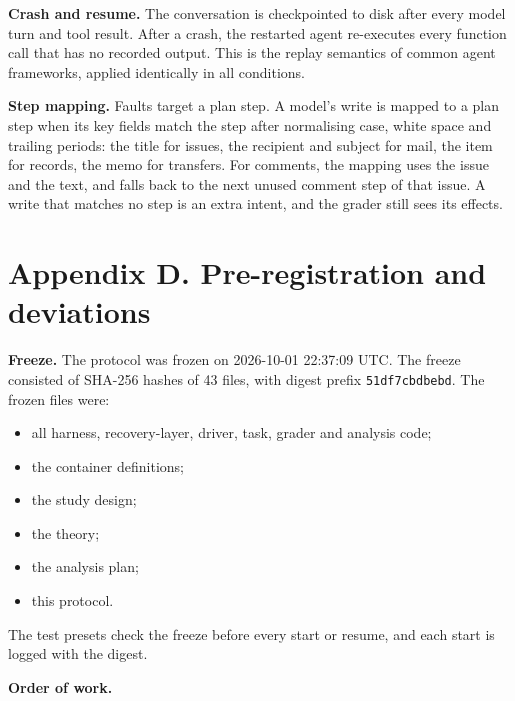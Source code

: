 \documentclass[
  10pt,
]{article}
\providecommand{\tightlist}{%
  \setlength{\itemsep}{0pt}\setlength{\parskip}{0pt}}
\begin{document}
\textbf{Crash and resume.} The conversation is checkpointed to disk
after every model turn and tool result. After a crash, the restarted
agent re-executes every function call that has no recorded output. This
is the replay semantics of common agent frameworks, applied identically
in all conditions.

\textbf{Step mapping.} Faults target a plan step. A model's write is
mapped to a plan step when its key fields match the step after
normalising case, white space and trailing periods: the title for
issues, the recipient and subject for mail, the item for records, the
memo for transfers. For comments, the mapping uses the issue and the
text, and falls back to the next unused comment step of that issue. A
write that matches no step is an extra intent, and the grader still sees
its effects.

\hypertarget{appendix-d.-pre-registration-and-deviations}{%
\section*{Appendix D. Pre-registration and
deviations}\label{appendix-d.-pre-registration-and-deviations}}

\textbf{Freeze.} The protocol was frozen on 2026-10-01 22:37:09 UTC. The
freeze consisted of SHA-256 hashes of 43 files, with digest prefix
\texttt{51df7cbdbebd}. The frozen files were:

\begin{itemize}
\tightlist
\item
  all harness, recovery-layer, driver, task, grader and analysis code;
\item
  the container definitions;
\item
  the study design;
\item
  the theory;
\item
  the analysis plan;
\item
  this protocol.
\end{itemize}

The test presets check the freeze before every start or resume, and each
start is logged with the digest.

\textbf{Order of work.}
\end{document}

